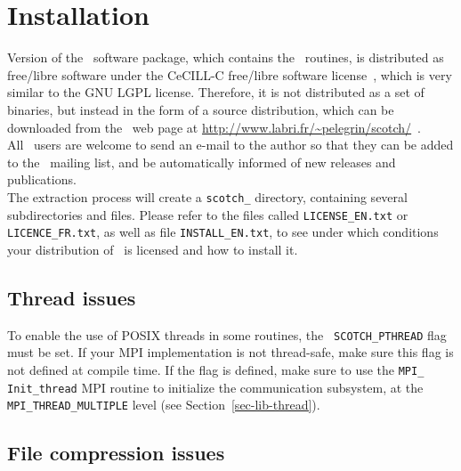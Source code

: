 
\section{Installation}
\label{sec-install}

Version {\sc \scotchver} of the \scotch\ software package, which
contains the \ptscotch\ routines, is distributed as free/libre
software under the CeCILL-C free/libre software license~\cite{cecill},
which is very similar to the GNU LGPL license. Therefore, it is not
distributed as a set of binaries, but instead in the form of a source
distribution, which can be downloaded from the \scotch\ web page at
\url{http://www.labri.fr/~pelegrin/scotch/}~.
\\

All \scotch\ users are welcome to send an e-mail to the author so that
they can be added to the \scotch\ mailing list, and be automatically
informed of new releases and publications.
\\

The extraction process will create a {\tt scotch\_\scotchversub}
directory, containing several subdirectories and files. Please refer
to the files called {\tt LICENSE\_\lbt EN.txt} or
{\tt LICENCE\_\lbt FR.txt}, as well as file
{\tt INSTALL\_\lbt EN.txt}, to see under which conditions your
distribution of \scotch\ is licensed and how to install it.

\subsection{Thread issues}

To enable the use of POSIX threads in some routines, the {\tt
SCOTCH\_\lbt PTHREAD} flag must be set. If your MPI implementation is
not thread-safe, make sure this flag is not defined at compile time.
If the flag is defined, make sure to use the \texttt{MPI\_\lbt
Init\_\lbt thread} MPI routine to initialize the communication
subsystem, at the \texttt{MPI\_\lbt THREAD\_\lbt MULTIPLE} level
(see Section~\ref{sec-lib-thread}).

\subsection{File compression issues}


